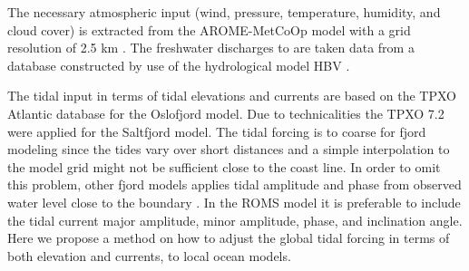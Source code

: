The necessary atmospheric input (wind, pressure, temperature, humidity, and cloud cover) is extracted from the AROME-MetCoOp model with a grid resolution of 2.5 km \cite[]{muller2015}. The freshwater discharges to are taken data from a database constructed by use of the hydrological model HBV \cite[]{beldring2003}.

The tidal input in terms of tidal elevations and currents are based on the TPXO Atlantic database \cite[]{egbert02} for the Oslofjord model. Due to technicalities the TPXO 7.2 were applied for the Saltfjord model. The tidal forcing is to coarse for fjord modeling since the tides vary over short distances and a simple interpolation to the model grid might not be sufficient close to the coast line. In order to omit this problem, other fjord models applies tidal amplitude and phase from observed water level close to the boundary \cite[i.e.]{svendsen96,lynge13}. In the ROMS model it is preferable to include the tidal current major amplitude, minor amplitude, phase, and inclination angle. Here we propose a method on how to adjust the global tidal forcing in terms of both elevation and currents, to local ocean models. 
